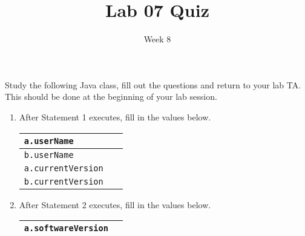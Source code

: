 \documentclass[12pt]{article}
\title{Lab 07 Quiz}
\date{Week 8}
\begin{document}
 

Study the following Java class, fill out the questions and return to your lab TA. This should be done at the beginning of your lab session.

\begin{enumerate}
    
\begin{lstlisting}
public class Windows10
{
	public static double currentVersion = 1.0;
	public double softwareVersion = 1.0;
	public String userName;

	public Windows10(String name)
	{
		userName = name;
	}
	public Windows10()
	{
		this("root");
	}
	public static void releaseUpdate()
	{
		currentVersion++;
	}
	public void performUpdate()
	{
		softwareVersion++;
	}
	public void performUpdate(double buildNumber)
	{
		currentVersion += buildNumber;
		softwareVersion += buildNumber;
	}
	public static void main(String[] args)
	{
		Windows10 a = new Windows10();				  
		Windows10 b = new Windows10("Bill");        

		releaseUpdate();				/* Statement 1 */

		a.performUpdate();         /* Statement 2 */     
		b.performUpdate(0.1);		/* Statement 3 */
	}
}
\end{lstlisting}
\newpage
\item {} After Statement 1 executes, fill in the values below.
\begin{table}[!htb]
\setlength{\tabcolsep}{5em}
\centering	
\renewcommand{\arraystretch}{1.6}
\begin{tabular}{|l|l| } \hline
\texttt{a.userName}&    \\ \hline

\texttt{b.userName} &    \\ \hline

\texttt{a.currentVersion}&     \\ \hline

\texttt{b.currentVersion }&    \\ \hline


\end{tabular}
\end{table}


\item {} After Statement 2 executes, fill in the values below.
\begin{table}[!htb]
\setlength{\tabcolsep}{5em}
\centering	
\renewcommand{\arraystretch}{1.6}
\begin{tabular}{|l|l| } \hline
\texttt{a.softwareVersion}&   \\ \hline


\end{tabular}
\end{table}
\end{enumerate}
\end{document}
